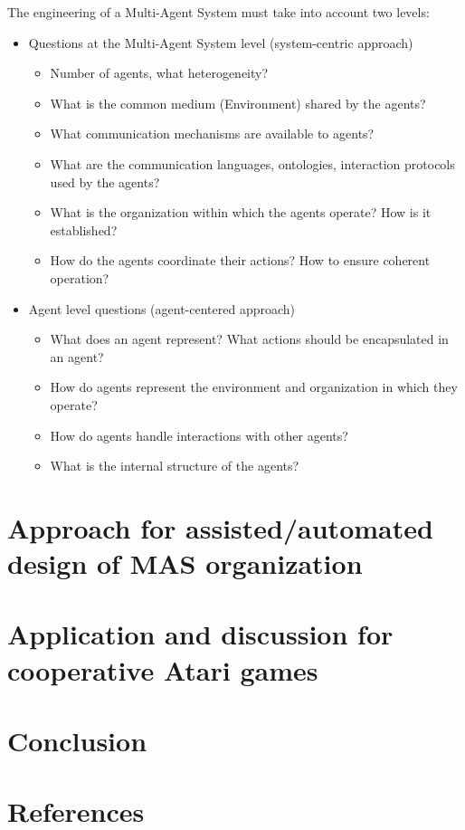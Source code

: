 \documentclass[runningheads]{llncs}
\begin{document}
The engineering of a Multi-Agent System must take into account two levels:

\begin{itemize}
    \item Questions at the Multi-Agent System level (system-centric approach)
          \begin{itemize}
              \item Number of agents, what heterogeneity?
              \item What is the common medium (Environment) shared by the agents?
              \item What communication mechanisms are available to agents?
              \item What are the communication languages, ontologies, interaction protocols used by the agents?
              \item What is the organization within which the agents operate? How is it established?
              \item How do the agents coordinate their actions? How to ensure coherent operation?
          \end{itemize}

    \item Agent level questions (agent-centered approach)
          \begin{itemize}
              \item What does an agent represent? What actions should be encapsulated in an agent?
              \item How do agents represent the environment and organization in which they operate?
              \item How do agents handle interactions with other agents?
              \item What is the internal structure of the agents?
          \end{itemize}
\end{itemize}

\section{Approach for assisted/automated design of MAS organization}

\section{Application and discussion for cooperative Atari games}


\section{Conclusion}

%
%
%
% 
% 
%
\section*{References}

% 



\end{document}
